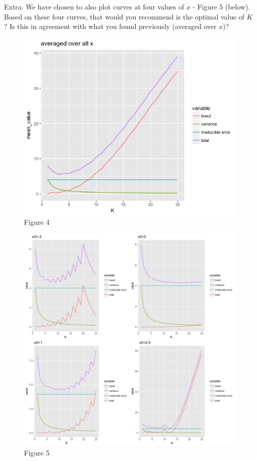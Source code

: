 \documentclass[]{article}
\begin{document}
Extra: We have chosen to also plot curves at four values of \(x\) -
Figure 5 (below). Based on these four curves, that would you recommend
is the optimal value of \(K\)? Is this in agreement with what you found
previously (averaged over \(x\))?

\begin{figure}
\centering
\includegraphics{Prob1f4.png}
\caption{Figure 4}
\end{figure}

\begin{figure}
\centering
\includegraphics{Prob1f5.png}
\caption{Figure 5}
\end{figure}
\end{document}
